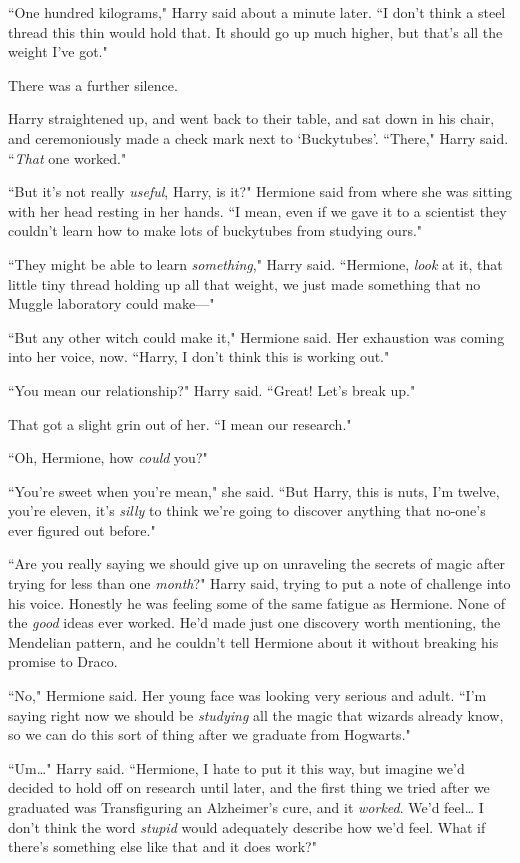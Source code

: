 ``One hundred kilograms," Harry said about a minute later. ``I don't think a steel thread this thin would hold that. It should go up much higher, but that's all the weight I've got."

There was a further silence.

Harry straightened up, and went back to their table, and sat down in his chair, and ceremoniously made a check mark next to `Buckytubes'. ``There," Harry said. ``\emph{That} one worked."

``But it's not really \emph{useful}, Harry, is it?" Hermione said from where she was sitting with her head resting in her hands. ``I mean, even if we gave it to a scientist they couldn't learn how to make lots of buckytubes from studying ours."

``They might be able to learn \emph{something}," Harry said. ``Hermione, \emph{look} at it, that little tiny thread holding up all that weight, we just made something that no Muggle laboratory could make—"

``But any other witch could make it," Hermione said. Her exhaustion was coming into her voice, now. ``Harry, I don't think this is working out."

``You mean our relationship?" Harry said. ``Great! Let's break up."

That got a slight grin out of her. ``I mean our research."

``Oh, Hermione, how \emph{could} you?"

``You're sweet when you're mean," she said. ``But Harry, this is nuts, I'm twelve, you're eleven, it's \emph{silly} to think we're going to discover anything that no-one's ever figured out before."

``Are you really saying we should give up on unraveling the secrets of magic after trying for less than one \emph{month}?" Harry said, trying to put a note of challenge into his voice. Honestly he was feeling some of the same fatigue as Hermione. None of the \emph{good} ideas ever worked. He'd made just one discovery worth mentioning, the Mendelian pattern, and he couldn't tell Hermione about it without breaking his promise to Draco.

``No," Hermione said. Her young face was looking very serious and adult. ``I'm saying right now we should be \emph{studying} all the magic that wizards already know, so we can do this sort of thing after we graduate from Hogwarts."

``Um{\ldots}" Harry said. ``Hermione, I hate to put it this way, but imagine we'd decided to hold off on research until later, and the first thing we tried after we graduated was Transfiguring an Alzheimer's cure, and it \emph{worked}. We'd feel{\ldots} I don't think the word \emph{stupid} would adequately describe how we'd feel. What if there's something else like that and it does work?"

